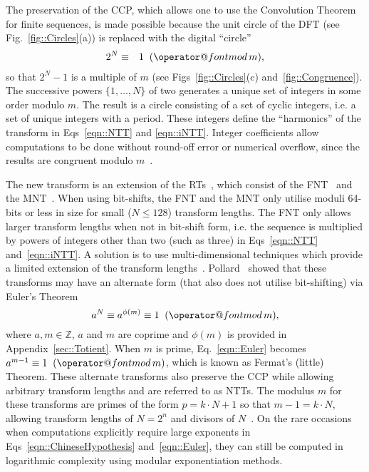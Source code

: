 \documentclass[twocolumn]{IEEEtran}
\makeatletter
\def\imod#1{\allowbreak\mkern10mu({\operator@font mod}\,#1)}
\newcommand{\primeSymbol}{p}
\newcommand{\modulusSymbol}{m}
\newcommand{\eqnTag}{Eq.}
\newcommand{\eqnsTag}{Eqs}
\newcommand{\figTag}{Fig.}
\newcommand{\figsTag}{Figs}
\makeatother
\begin{document}
The preservation of the \ac{CCP}, which allows one to use the Convolution Theorem for finite sequences, is made possible because the unit circle of the \ac{DFT} (see \figTag~\ref{fig::Circles}(a)) is replaced with the digital ``circle''
\begin{eqnarray}\label{eqn::ChineseHypothesis}
2^{N} &\equiv& 1 \imod \modulusSymbol,
\end{eqnarray}
so that $2^{N} - 1$ is a multiple of $\modulusSymbol$ (see \figsTag~\ref{fig::Circles}(c) and~\ref{fig::Congruence}). The successive powers $\{1,\ldots,N\}$ of two generates a unique set of integers in some order modulo $\modulusSymbol$. The result is a circle consisting of a set of cyclic integers, i.e. a set of unique integers with a period. These integers define the ``harmonics'' of the transform in \eqnsTag~\eqref{eqn::NTT} and \eqref{eqn::iNTT}. Integer coefficients allow computations to be done without round-off error or numerical overflow, since the results are congruent modulo $\modulusSymbol$~\citep{Nussbaumer1978}.

The new transform is an extension of the \acp{RT}~\citep{Agarwal1974}, which consist of the \ac{FNT}~\citep{Schonhage1971} and the \ac{MNT}~\citep{Rader1972}. When using bit-shifts, the \ac{FNT} and the \ac{MNT} only utilise moduli 64-bits or less in size for small ($N \leqslant 128$) transform lengths. The \ac{FNT} only allows larger transform lengths when not in bit-shift form, i.e. the sequence is multiplied by powers of integers other than two (such as three) in \eqnsTag~\eqref{eqn::NTT} and~\eqref{eqn::iNTT}. A solution is to use multi-dimensional techniques which provide a limited extension of the transform lengths~\citep{Agarwal1974a}. Pollard~\citep{Pollard1971} showed that these transforms may have an alternate form (that also does not utilise bit-shifting) via Euler's Theorem
\begin{equation}\label{eqn::Euler}
a^{N} \equiv a^{\phi(\modulusSymbol)} \equiv 1 \imod \modulusSymbol,
\end{equation}
where $a, \modulusSymbol \in \mathbb{Z}$, $a$ and $\modulusSymbol$ are coprime and $\phi(\modulusSymbol)$ is provided in Appendix~\ref{sec::Totient}. When $\modulusSymbol$ is prime, \eqnTag~\eqref{eqn::Euler} becomes $a^{\modulusSymbol-1} \equiv 1 \imod \modulusSymbol$, which is known as Fermat's (little) Theorem. These alternate transforms also preserve the \ac{CCP} while allowing arbitrary transform lengths and are referred to as \acp{NTT}. The modulus $\modulusSymbol$ for these transforms are primes of the form $\primeSymbol = k\cdot N + 1$ so that $\modulusSymbol-1 = k\cdot N$, allowing transform lengths of $N = 2^n$ and divisors of $N$~\citep{Bhattacharya2000}. On the rare occasions when computations explicitly require large exponents in \eqnsTag~\eqref{eqn::ChineseHypothesis} and~\eqref{eqn::Euler}, they can still be computed in logarithmic complexity using modular exponentiation methods.
\end{document}
